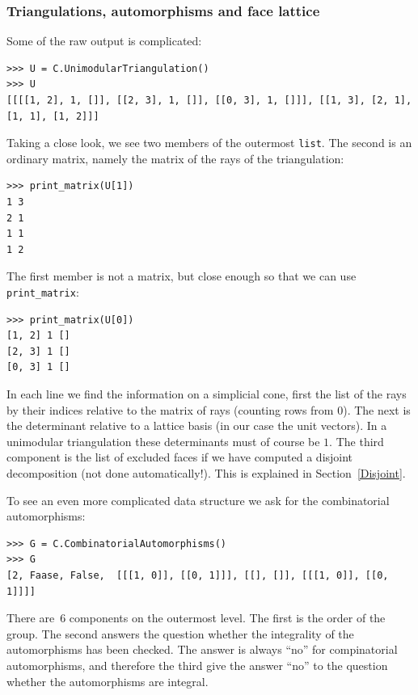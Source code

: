 \begin{small}
\subsubsection{Triangulations, automorphisms and face lattice}
Some of the raw output is complicated:
\begin{Verbatim}
>>> U = C.UnimodularTriangulation()
>>> U
[[[[1, 2], 1, []], [[2, 3], 1, []], [[0, 3], 1, []]], [[1, 3], [2, 1], [1, 1], [1, 2]]]
\end{Verbatim}
Taking a close look, we see two members of the outermost \verb|list|. The second is an ordinary matrix, namely the matrix of the rays of the triangulation:
\begin{Verbatim}
>>> print_matrix(U[1])
1 3
2 1
1 1
1 2
\end{Verbatim}
The first member is not a matrix, but close enough so that we can use \verb|print_matrix|:
\begin{Verbatim}
>>> print_matrix(U[0])
[1, 2] 1 []
[2, 3] 1 []
[0, 3] 1 []
\end{Verbatim}
In each line we find the information on a simplicial cone, first the list of the rays by their indices relative to the matrix of rays (counting rows from $0$). The next is the determinant relative to a lattice basis (in our case the unit vectors). In a unimodular triangulation these determinants must of course be $1$. The third component is the list of excluded faces if we have computed a disjoint decomposition (not done automatically!). This is explained in Section~\ref{Disjoint}.

To see an even more complicated data structure we ask for the combinatorial automorphisms:
\begin{Verbatim}
>>> G = C.CombinatorialAutomorphisms()
>>> G
[2, Faase, False,  [[[1, 0]], [[0, 1]]], [[], []], [[[1, 0]], [[0, 1]]]]
\end{Verbatim}
There are~$6$ components on the outermost level. The first is the order of the group. The second answers the question whether the integrality of the automorphisms has been checked. The answer is always ``no'' for compinatorial automorphisms, and therefore the third give the answer ``no'' to the question whether the automorphisms are integral.


\end{small}
